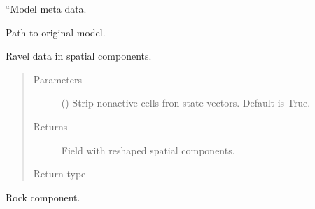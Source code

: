 \documentclass[letterpaper,10pt,english]{sphinxmanual}
\begin{document}
\begin{fulllineitems}

\begin{fulllineitems}
\label{\detokenize{api/field:geology.src.Field.meta}}
“Model meta data.

\end{fulllineitems}


\begin{fulllineitems}
\label{\detokenize{api/field:geology.src.Field.path}}
Path to original model.

\end{fulllineitems}


\begin{fulllineitems}
\label{\detokenize{api/field:geology.src.Field.ravel}}
Ravel data in spatial components.
\begin{quote}\begin{description}
\item[{Parameters}] \leavevmode
{} () \textendash{} Strip non\sphinxhyphen{}active cells fron state vectors. Default is True.

\item[{Returns}] \leavevmode
{} \textendash{} Field with reshaped spatial components.

\item[{Return type}] \leavevmode
{\hyperref[\detokenize{api/field:geology.src.Field}]{}}

\end{description}\end{quote}

\end{fulllineitems}


\begin{fulllineitems}
\label{\detokenize{api/field:geology.src.Field.rock}}
Rock component.


\end{fulllineitems}
\end{fulllineitems}
\end{document}
